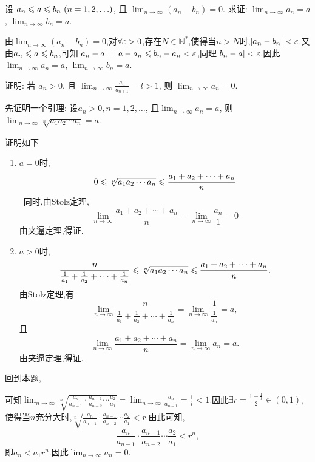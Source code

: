 \begin{exercise}[1.2.19]
    设 $a_n \leqslant a \leqslant b_n \ (n=1, 2, \ldots)$, 且 $\lim_{n\to\infty} (a_n - b_n) = 0$. 求证: $\lim_{n\to\infty} a_n = a$, $\lim_{n\to\infty} b_n = a$.
\end{exercise}

\begin{solution}
    由$\lim_{n\to\infty} (a_n - b_n) = 0$,对$\forall \varepsilon > 0$,存在$N\in \mathbb{N}^*$,使得当$n>N$时,$|a_n - b_n| < \varepsilon$.又由$a_n \leqslant a \leqslant b_n$,可知$|a_n - a| = a -a_n \leqslant b_n - a_n < \varepsilon$,同理$|b_n - a| < \varepsilon$.因此$\lim_{n\to\infty} a_n = a$, $\lim_{n\to\infty} b_n = a$.
\end{solution}

\begin{exercise}[1.2.20]
    证明: 若 $a_n > 0$, 且 $\lim_{n\to\infty} \frac{a_{n}}{a_{n+1}} = l > 1$, 则 $\lim_{n\to\infty} a_n = 0$.
\end{exercise}

\begin{solution}
    先证明一个引理:
    设$a_n > 0, n = 1, 2, \ldots$, 且$\lim_{n\to\infty} a_n = a$, 则$\lim_{n\to\infty} \sqrt[n]{a_1 a_2 \cdots a_n} = a$.

    证明如下
    \begin{enumerate}[(1)]
        \item $a=0$时,$$0 \leqslant \sqrt[n]{a_1 a_2 \cdots a_n} \leqslant \frac{a_1 + a_2 + \cdots + a_n}{n} $$
              \     同时,由Stolz定理,$$\lim_{n\to\infty}  \frac{a_1 + a_2 + \cdots + a_n}{n}=\lim_{n\to\infty}  \frac{a_n}{1}=0$$
              由夹逼定理,得证.
        \item $a>0$时,$$\frac{n}{\frac{1}{a_1} + \frac{1}{a_2} + \cdots + \frac{1}{a_n}} \leqslant \sqrt[n]{a_1 a_2 \cdots a_n} \leqslant \frac{a_1 + a_2 + \cdots + a_n}{n}.$$
              由Stolz定理,有$$\lim_{n\to\infty} \frac{n}{\frac{1}{a_1} + \frac{1}{a_2} + \cdots + \frac{1}{a_n}} = \lim_{n\to\infty} \frac{1}{\frac{1}{a_n}} = a,$$且$$\lim_{n\to\infty} \frac{a_1 + a_2 + \cdots + a_n}{n} = \lim_{n\to\infty} a_n = a.$$
              由夹逼定理,得证.
    \end{enumerate}

    回到本题,

    可知$\lim_{n\to\infty} \sqrt[n]{\frac{a_{n}}{a_{n-1}} \cdot \frac{a_{n-1}}{a_{n-2}} \cdots \frac{a_2}{a_1}} = \lim_{n\to\infty} \frac{a_n}{a_{n-1}} = \frac{1}{l} < 1$.因此$\exists r = \frac{1 + \frac{1}{l}}{2} \in (0,1)$,使得当$n$充分大时,$\sqrt[n]{\frac{a_{n}}{a_{n-1}} \cdot \frac{a_{n-1}}{a_{n-2}} \cdots \frac{a_2}{a_1}} < r$.由此可知,$$\frac{a_n}{a_{n-1}} \cdot \frac{a_{n-1}}{a_{n-2}} \cdots \frac{a_2}{a_1} < r^n,$$即$a_n < a_1 r^n.$因此$\lim_{n\to\infty} a_n = 0$.
\end{solution}

